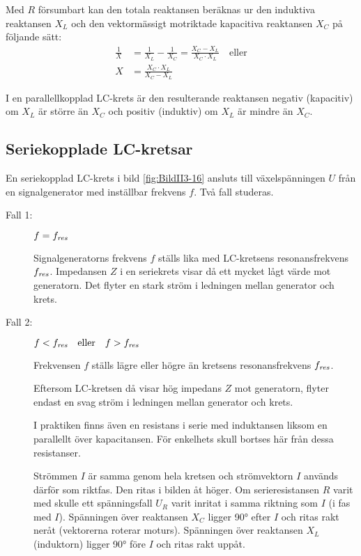 \begin{description}
Med \(R\) försumbart kan den totala reaktansen beräknas ur den induktiva reaktansen \(X_L\)
och den vektormässigt motriktade kapacitiva reaktansen \(X_C\) på följande sätt:
%
\begin{align*}
	\frac{1}{X} &= \frac{1}{X_L} - \frac{1}{X_C} = \frac{X_C - X_L}{X_C \cdot X_L}
	\quad \text{eller} \\
	X &= \frac{X_C \cdot X_L}{X_C - X_L}
\end{align*}

I en parallellkopplad LC-krets är den resulterande reaktansen negativ
(kapacitiv) om \(X_L\) är större än \(X_C\) och positiv (induktiv) om \(X_L\) är
mindre än \(X_C\).
\end{description}

\subsection{Seriekopplade LC-kretsar}


En seriekopplad LC-krets i bild \ref{fig:BildII3-16} ansluts till
växelspänningen \(U\) från en signalgenerator med inställbar frekvens \(f\).
Två fall studeras.

\begin{description}
\item[Fall 1:] \(f = f_{\it res}\)

Signalgeneratorns frekvens \(f\) ställs lika med LC-kretsens resonansfrekvens
\(f_{\it res}\).
Impedansen \(Z\) i en seriekrets visar då ett mycket lågt värde mot generatorn.
Det flyter en stark ström i ledningen mellan generator och krets.

\item[Fall 2:] \(f < f_{\it res} \quad \text{eller} \quad f > f_{\it res}\)

Frekvensen \(f\) ställs lägre eller högre än kretsens resonansfrekvens
\(f_{\it res}\).

Eftersom LC-kretsen då visar hög impedans \(Z\) mot generatorn, flyter
endast en svag ström i ledningen mellan generator och krets.

I praktiken finns även en resistans i serie med induktansen liksom en
parallellt över kapacitansen.
För enkelhets skull bortses här från dessa resistanser.

Strömmen \(I\) är samma genom hela kretsen och strömvektorn \(I\) används
därför som riktfas.
Den ritas i bilden åt höger.
Om serieresistansen \(R\) varit med skulle ett spänningsfall \(U_R\) varit
inritat i samma riktning som \(I\) (i fas med \(I\)).
Spänningen över reaktansen \(X_C\) ligger \ang{90} efter \(I\) och ritas
rakt neråt (vektorerna roterar moturs).
Spänningen över reaktansen \(X_L\) (induktorn) ligger \ang{90} före \(I\) och
ritas rakt uppåt.
\end{description}

